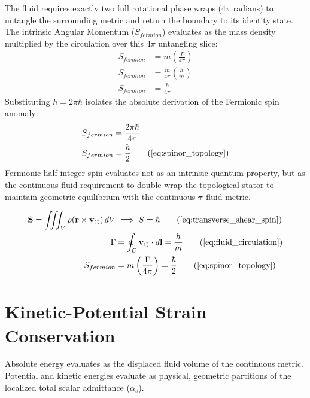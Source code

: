 \documentclass[11pt, a4paper]{article}
\begin{document}
The fluid requires exactly two full rotational phase wraps ($4\pi$ radians) to untangle the surrounding metric and return the boundary to its identity state. The intrinsic Angular Momentum ($S_{fermion}$) evaluates as the mass density multiplied by the circulation over this $4\pi$ untangling slice:
\begin{align}
    S_{fermion} &= m \left( \frac{\Gamma}{4\pi} \right)  \\
    S_{fermion} &= \frac{m}{4\pi} \left( \frac{h}{m} \right)  \\
    S_{fermion} &= \frac{h}{4\pi} 
\end{align}
Substituting $h = 2\pi\hbar$ isolates the absolute derivation of the Fermionic spin anomaly:
\begin{align}
    S_{fermion} &= \frac{2\pi\hbar}{4\pi}  \\
    S_{fermion} &= \frac{\hbar}{2} \tag{\ref{eq:spinor_topology}}
\end{align}
Fermionic half-integer spin evaluates not as an intrinsic quantum property, but as the continuous fluid requirement to double-wrap the topological stator to maintain geometric equilibrium with the continuous $\boldsymbol{\tau}$-fluid metric.

\begin{tcolorbox}[recallbox, title={\ref{box:quantum_spin}. Fluid Circulation \& The Topological Origin of Spin}]
\begin{align}
    \mathbf{S} = \iiint_V \rho (\mathbf{r} \times \mathbf{v}_{\circlearrowleft}) \, dV &\implies S = \hbar \tag{\ref{eq:transverse_shear_spin}} \\
    \Gamma &= \oint_C \mathbf{v}_{\circlearrowleft} \cdot d\mathbf{l} = \frac{h}{m} \tag{\ref{eq:fluid_circulation}} \\
    S_{fermion} &= m \left( \frac{\Gamma}{4\pi} \right) = \frac{\hbar}{2} \tag{\ref{eq:spinor_topology}}
\end{align}
\end{tcolorbox}

\section{Kinetic-Potential Strain Conservation}
\label{sec:deriv_volumetric_energy}

Absolute energy evaluates as the displaced fluid volume of the continuous metric. Potential and kinetic energies evaluate as physical, geometric partitions of the localized total scalar admittance ($\alpha_s$).
\end{document}

